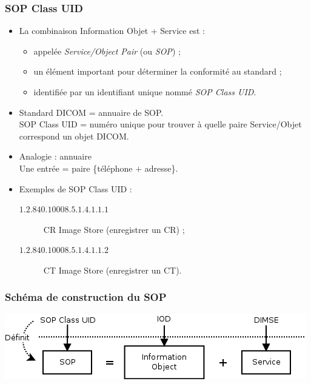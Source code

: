 	\frame
	{
		\frametitle{SOP Class UID}

		\begin{itemize}
			\item La combinaison Information Objet + Service est :
			\begin{itemize}
				\item appel\'ee \emph{Service/Object Pair} (ou \emph{SOP}) ;
				\item un \'el\'ement important pour d\'eterminer la conformit\'e au standard ;
				\item identifi\'ee par un identifiant unique nomm\'e \emph{SOP Class UID}.
			\end{itemize}
		
			\item Standard DICOM = annuaire de SOP.\\
			SOP Class UID = num\'ero unique pour trouver \`a quelle paire Service/Objet correspond un objet DICOM.
			\item Analogie : annuaire\\
			Une entr\'ee = paire \{t\'el\'ephone $+$ adresse\}.
			\item Exemples de SOP Class UID :
			\begin{description}
				\item[$1.2.840.10008.5.1.4.1.1.1$] CR Image Store (enregistrer un CR) ;
				\item[$1.2.840.10008.5.1.4.1.1.2$] CT Image Store (enregistrer un CT).
			\end{description}
		\end{itemize}
	}
	
	\frame
	{
		\frametitle{Sch\'ema de construction du SOP}
		\begin{center}
			\includegraphics[width=\linewidth]{./figures/sop-definition.png}
		\end{center}		
	}

